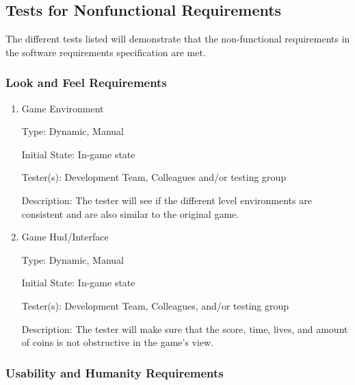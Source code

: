 \documentclass[12pt, titlepage]{article}
\begin{document}
\subsection{Tests for Nonfunctional Requirements}
The different tests listed will demonstrate that the non-functional requirements in the software requirements specification are met.

\subsubsection{Look and Feel Requirements}

\begin{enumerate}

\item{Game Environment\\}

Type: Dynamic, Manual

Initial State: In-game state

Tester(s): Development Team, Colleagues and/or testing group

Description: The tester will see if the different level environments are consistent and are also similar to the original game.
					
\item{Game Hud/Interface\\}

Type: Dynamic, Manual

Initial State: In-game state

Tester(s): Development Team, Colleagues, and/or testing group

Description: The tester will make sure that the score, time, lives, and amount of coins is not obstructive in the game's view.

\end{enumerate}

\subsubsection{Usability and Humanity Requirements}
\end{document}
